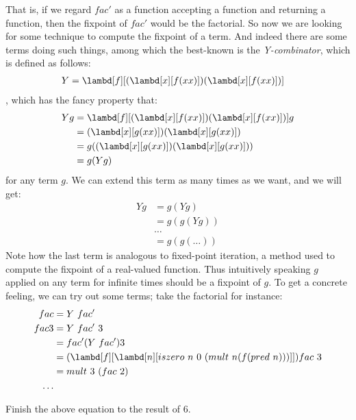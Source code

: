 \documentclass[../../../include/open-logic-section]{subfiles}
\begin{document}
That is, if we regard $fac'$ as a function accepting a function and
returning a function, then the fixpoint of $fac'$ would be the
factorial. So now we are looking for some technique to compute the
fixpoint of a term. And indeed there are some terms doing such things,
among which the best-known is the \emph{Y-combinator}, which is
defined as follows:
\begin{align*}
  Y &=  \lambd[f][(\lambd[x][f (x x)]) (\lambd[x][f (x x)])]
\end{align*}
, which has the fancy property that:
\begin{align*}
  Y g &= \lambd[f][(\lambd[x][f (x x)]) (\lambd[x][f (x x)])] g \\
      &= (\lambd[x][g (x x)]) (\lambd[x][g (x x)]) \\
      &= g ((\lambd[x][g (x x)]) (\lambd[x][g (x x)])) \\
      &= g (Y g)
\end{align*}
for any term $g$. We can extend this term as many times as we want,
and we will get:
\begin{align*}
    Y g &= g (Y g) \\
        &= g (g (Y g)) \\
        &\ldots \\
        &= g (g (\ldots ))
\end{align*}
Note how the last term is analogous to fixed-point iteration, a method used to
compute the fixpoint of a real-valued function. Thus intuitively
speaking $g$ applied on any term for infinite times should be a
fixpoint of $g$. To get a concrete feeling, we can try out some terms;
take the factorial for instance:
\begin{align*}
  fac &= Y ~ fac'\\
  fac 3 &= Y ~ fac' ~ 3 \\
      &=fac' (Y ~ fac') 3 \\
      &=(\lambd[f][\lambd[n][iszero ~ n ~ 0 ~ (mult ~ n (f (pred ~ n)))]])
  fac ~ 3\\
      &= mult ~ 3 ~ (fac ~ 2) \\
      \ldots
\end{align*}

\begin{prob}
  Finish the above equation to the result of $6$.
\end{prob}
\end{document}
